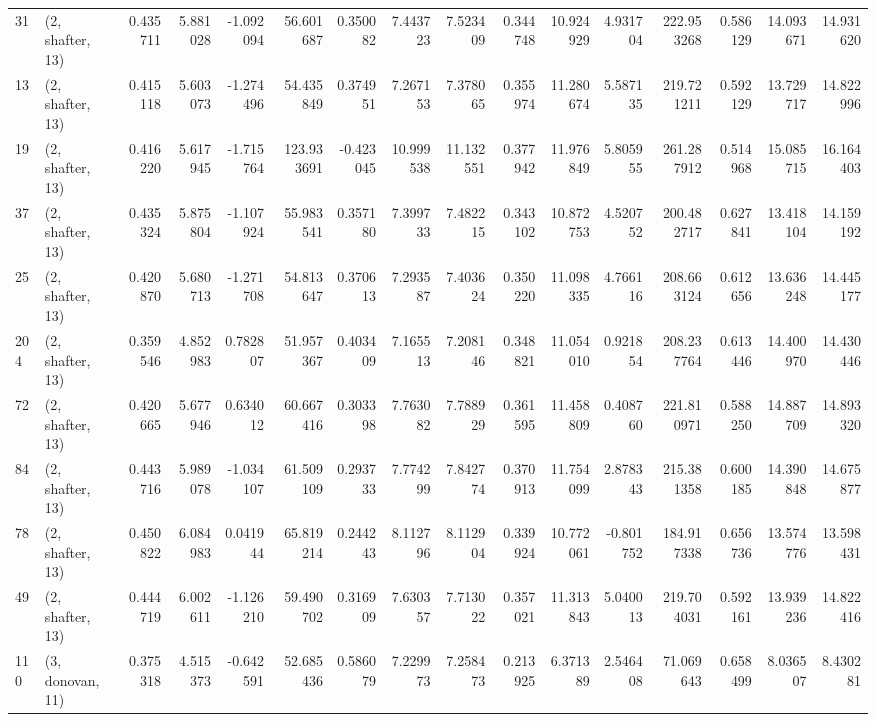 \begin{tabular}{llrrrrrrrrrrrrrr}
31  &  (2, shafter, 13) &   0.435711 &   5.881028 &  -1.092094 &    56.601687 &   0.350082 &   7.443723 &   7.523409 &  0.344748 &  10.924929 &   4.931704 &   222.953268 &   0.586129 &  14.093671 &  14.931620 \\
13  &  (2, shafter, 13) &   0.415118 &   5.603073 &  -1.274496 &    54.435849 &   0.374951 &   7.267153 &   7.378065 &  0.355974 &  11.280674 &   5.587135 &   219.721211 &   0.592129 &  13.729717 &  14.822996 \\
19  &  (2, shafter, 13) &   0.416220 &   5.617945 &  -1.715764 &   123.933691 &  -0.423045 &  10.999538 &  11.132551 &  0.377942 &  11.976849 &   5.805955 &   261.287912 &   0.514968 &  15.085715 &  16.164403 \\
37  &  (2, shafter, 13) &   0.435324 &   5.875804 &  -1.107924 &    55.983541 &   0.357180 &   7.399733 &   7.482215 &  0.343102 &  10.872753 &   4.520752 &   200.482717 &   0.627841 &  13.418104 &  14.159192 \\
25  &  (2, shafter, 13) &   0.420870 &   5.680713 &  -1.271708 &    54.813647 &   0.370613 &   7.293587 &   7.403624 &  0.350220 &  11.098335 &   4.766116 &   208.663124 &   0.612656 &  13.636248 &  14.445177 \\
204 &  (2, shafter, 13) &   0.359546 &   4.852983 &   0.782807 &    51.957367 &   0.403409 &   7.165513 &   7.208146 &  0.348821 &  11.054010 &   0.921854 &   208.237764 &   0.613446 &  14.400970 &  14.430446 \\
72  &  (2, shafter, 13) &   0.420665 &   5.677946 &   0.634012 &    60.667416 &   0.303398 &   7.763082 &   7.788929 &  0.361595 &  11.458809 &   0.408760 &   221.810971 &   0.588250 &  14.887709 &  14.893320 \\
84  &  (2, shafter, 13) &   0.443716 &   5.989078 &  -1.034107 &    61.509109 &   0.293733 &   7.774299 &   7.842774 &  0.370913 &  11.754099 &   2.878343 &   215.381358 &   0.600185 &  14.390848 &  14.675877 \\
78  &  (2, shafter, 13) &   0.450822 &   6.084983 &   0.041944 &    65.819214 &   0.244243 &   8.112796 &   8.112904 &  0.339924 &  10.772061 &  -0.801752 &   184.917338 &   0.656736 &  13.574776 &  13.598431 \\
49  &  (2, shafter, 13) &   0.444719 &   6.002611 &  -1.126210 &    59.490702 &   0.316909 &   7.630357 &   7.713022 &  0.357021 &  11.313843 &   5.040013 &   219.704031 &   0.592161 &  13.939236 &  14.822416 \\
110 &  (3, donovan, 11) &   0.375318 &   4.515373 &  -0.642591 &    52.685436 &   0.586079 &   7.229973 &   7.258473 &  0.213925 &   6.371389 &   2.546408 &    71.069643 &   0.658499 &   8.036507 &   8.430281 \\

\end{tabular}
